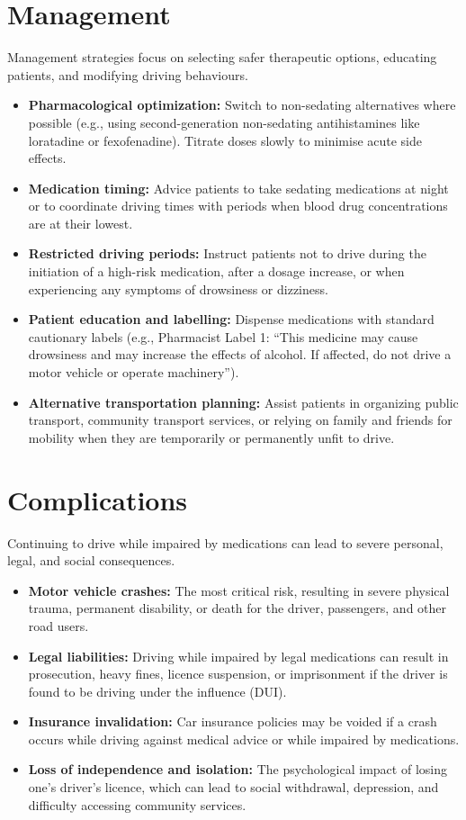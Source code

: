 \section*{Management}
Management strategies focus on selecting safer therapeutic options, educating patients, and modifying driving behaviours.
\begin{itemize}
    \item \textbf{Pharmacological optimization:} Switch to non-sedating alternatives where possible (e.g., using second-generation non-sedating antihistamines like loratadine or fexofenadine). Titrate doses slowly to minimise acute side effects.
    \item \textbf{Medication timing:} Advice patients to take sedating medications at night or to coordinate driving times with periods when blood drug concentrations are at their lowest.
    \item \textbf{Restricted driving periods:} Instruct patients not to drive during the initiation of a high-risk medication, after a dosage increase, or when experiencing any symptoms of drowsiness or dizziness.
    \item \textbf{Patient education and labelling:} Dispense medications with standard cautionary labels (e.g., Pharmacist Label 1: ``This medicine may cause drowsiness and may increase the effects of alcohol. If affected, do not drive a motor vehicle or operate machinery'').
    \item \textbf{Alternative transportation planning:} Assist patients in organizing public transport, community transport services, or relying on family and friends for mobility when they are temporarily or permanently unfit to drive.
\end{itemize}

\section*{Complications}
Continuing to drive while impaired by medications can lead to severe personal, legal, and social consequences.
\begin{itemize}
    \item \textbf{Motor vehicle crashes:} The most critical risk, resulting in severe physical trauma, permanent disability, or death for the driver, passengers, and other road users.
    \item \textbf{Legal liabilities:} Driving while impaired by legal medications can result in prosecution, heavy fines, licence suspension, or imprisonment if the driver is found to be driving under the influence (DUI).
    \item \textbf{Insurance invalidation:} Car insurance policies may be voided if a crash occurs while driving against medical advice or while impaired by medications.
    \item \textbf{Loss of independence and isolation:} The psychological impact of losing one's driver's licence, which can lead to social withdrawal, depression, and difficulty accessing community services.
\end{itemize}

